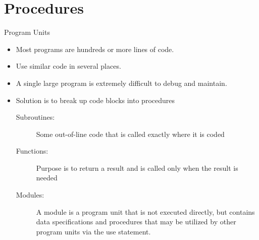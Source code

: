 \documentclass[10pt,t]{beamer}
\begin{document}
\section{Procedures}
\begin{frame}{Program Units}
  \begin{itemize}
    \item Most programs are hundreds or more lines of code.
    \item Use similar code in several places.
    \item A single large program is extremely difficult to debug and maintain.
    \item Solution is to break up code blocks into procedures
    \begin{description}
      \item[Subroutines:] Some out-of-line code that is called exactly where it is coded
      \item[Functions:] Purpose is to return a result and is called only when the result is needed
      \item[Modules:] A module is a program unit that is not executed directly, but contains data specifications
and procedures that may be utilized by other program units via the use statement.
    \end{description}
  \end{itemize}
%
%
%
%
%
%
%
\end{frame}
\end{document}
